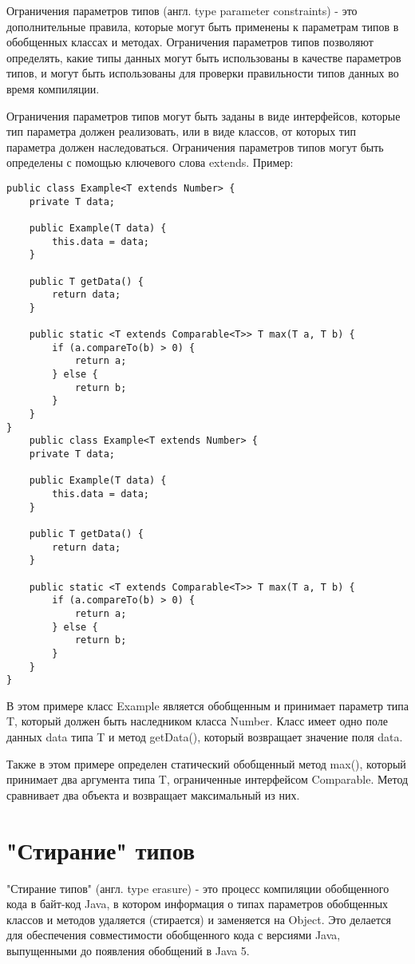 Ограничения параметров типов (англ. type parameter constraints) - это дополнительные правила, которые могут быть применены к параметрам типов в обобщенных классах и методах. Ограничения параметров типов позволяют определять, какие типы данных могут быть использованы в качестве параметров типов, и могут быть использованы для проверки правильности типов данных во время компиляции.

Ограничения параметров типов могут быть заданы в виде интерфейсов, которые тип параметра должен реализовать, или в виде классов, от которых тип параметра должен наследоваться. Ограничения параметров типов могут быть определены с помощью ключевого слова extends.
Пример:
\begin{lstlisting}public class Example<T extends Number> {
    private T data;

    public Example(T data) {
        this.data = data;
    }

    public T getData() {
        return data;
    }

    public static <T extends Comparable<T>> T max(T a, T b) {
        if (a.compareTo(b) > 0) {
            return a;
        } else {
            return b;
        }
    }
}
    public class Example<T extends Number> {
    private T data;

    public Example(T data) {
        this.data = data;
    }

    public T getData() {
        return data;
    }

    public static <T extends Comparable<T>> T max(T a, T b) {
        if (a.compareTo(b) > 0) {
            return a;
        } else {
            return b;
        }
    }
}
\end{lstlisting}
В этом примере класс Example является обобщенным и принимает параметр типа T, который должен быть наследником класса Number. Класс имеет одно поле данных data типа T и метод getData(), который возвращает значение поля data.

Также в этом примере определен статический обобщенный метод max(), который принимает два аргумента типа T, ограниченные интерфейсом Comparable. Метод сравнивает два объекта и возвращает максимальный из них.

\section{"Стирание" типов}
"Стирание типов" (англ. type erasure) - это процесс компиляции обобщенного кода в байт-код Java, в котором информация о типах параметров обобщенных классов и методов удаляется (стирается) и заменяется на Object. Это делается для обеспечения совместимости обобщенного кода с версиями Java, выпущенными до появления обобщений в Java 5.

